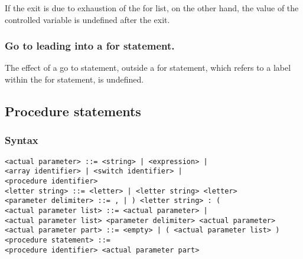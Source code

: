 \documentclass[a4paper,11pt]{article}
\begin{document}
If the exit is due to exhaustion of the for list, on the other hand,
the value of the controlled variable is undefined after the exit.

\subsubsection{Go to leading into a for statement.}

The effect of a go to statement, outside a for statement, which refers
to a label within the for statement, is undefined.




\subsection{Procedure statements}
\label{LblProcedureStatements}


\subsubsection{Syntax}
\label{LblProcedureStatementsSyntax}

\begin{flushleft}
\vspace{0.2em}\texttt{<actual parameter> ::= <string> | <expression> |\\
  \hspace{1.0cm}<array identifier> | <switch identifier> |\\
  \hspace{1.0cm}<procedure identifier>}\\

\vspace{0.2em}\texttt{<letter string> ::= <letter> | <letter string> <letter>}\\

\vspace{0.2em}\texttt{<parameter delimiter> ::= , | ) <letter string> : (}\\

\vspace{0.2em}\texttt{<actual parameter list> ::= <actual parameter> |\\
  \hspace{1.0cm}<actual parameter list> <parameter delimiter> <actual parameter>}\\

\vspace{0.2em}\texttt{<actual parameter part> ::= <empty> | ( <actual parameter list> )}\\

\vspace{0.2em}\texttt{<procedure statement> ::=\\
  \hspace{1.0cm}<procedure identifier> <actual parameter part>}\\
\end{flushleft}
\end{document}
